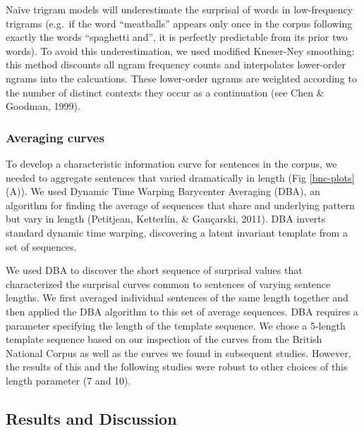 \documentclass[10pt, letterpaper]{article}
\begin{document}
Naïve trigram models will underestimate the surprisal of words in
low-frequency trigrams (e.g.~if the word ``meatballs'' appears only once
in the corpus following exactly the words ``spaghetti and'', it is
perfectly predictable from its prior two words). To avoid this
underestimation, we used modified Kneser-Ney smoothing: this method
discounts all ngram frequency counts and interpolates lower-order ngrams
into the calcuations. These lower-order ngrams are weighted according to
the number of distinct contexts they occur as a continuation (see Chen
\& Goodman, 1999).

\hypertarget{averaging-curves}{%
\subsubsection{Averaging curves}\label{averaging-curves}}

To develop a characteristic information curve for sentences in the
corpus, we needed to aggregate sentences that varied dramatically in
length (Fig \ref{bnc-plots}(A)). We used Dynamic Time Warping Barycenter
Averaging (DBA), an algorithm for finding the average of sequences that
share and underlying pattern but vary in length (Petitjean, Ketterlin,
\& Gançarski, 2011). DBA inverts standard dynamic time warping,
discovering a latent invariant template from a set of sequences.

We used DBA to discover the short sequence of surprisal values that
characterized the surprisal curves common to sentences of varying
sentence lengths. We first averaged individual sentences of the same
length together and then applied the DBA algorithm to this set of
average sequences. DBA requires a parameter specifying the length of the
template sequence. We chose a 5-length template sequence based on our
inspection of the curves from the British National Corpus as well as the
curves we found in subsequent studies. However, the results of this and
the following studies were robust to other choices of this length
parameter (7 and 10).

\hypertarget{results-and-discussion}{%
\subsection{Results and Discussion}\label{results-and-discussion}}
\end{document}
